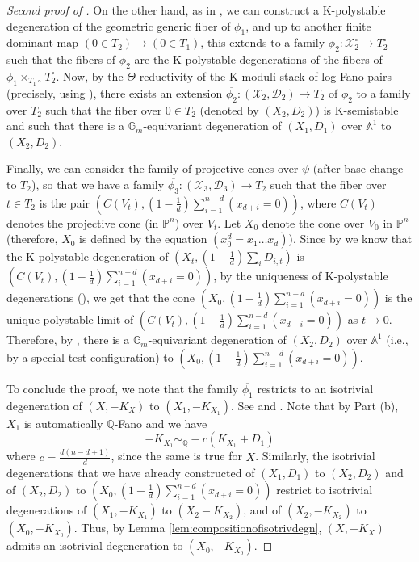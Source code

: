 \documentclass[11pt,reqno]{amsart}
\newcommand{\A}{\mathbb{A}}
\newcommand{\G}{\mathbb{G}}
\newcommand{\Q}{\mathbb{Q}}
\renewcommand{\P}{\mathbb{P}}
\newcommand{\cD}{\mathcal{D}}
\newcommand{\cX}{\mathcal{X}}
\numberwithin{equation}{section}
\theoremstyle{definition}
\begin{document}
\begin{proof}[Second proof of ]
On the other hand, as in , we can construct a K-polystable degeneration of the geometric generic fiber of $\phi_1$, and up to another finite dominant map $(0 \in T_2 ) \to (0 \in T_1)$, this extends to a family $\phi_2: \cX_2 ^{\circ} \to T_2 ^\circ $ such that the fibers of $\phi_2$ are the K-polystable degenerations of the fibers of $\phi_1 \times _{T_1 \circ} T_2 ^\circ$. Now, by the $\Theta$-reductivity of the K-moduli stack of log Fano pairs (precisely, using \cite[Theorem~5.2]{ABHLXReductivity}), there exists an extension $\overline{\phi_2} : (\cX_2, \cD_2) \to T_2$ of $\phi_2$ to a family over $T_2$ such that the fiber over $0 \in T_2$ (denoted by $(X_2 ,D_2) $) is K-semistable and such that there is a $\G_m$-equivariant degeneration of $(X_1, D_1)$ over $\A^1$ to $(X_2, D_2)$.  

Finally, we can consider the family of projective cones over $\psi$ (after base change to $T_2$), so that we have a family
$\overline{\phi_3} : (\cX_3, \cD_3) \to T_2 $ such that the fiber over $t \in T_2$ is the pair $(C(V_t), (1 -\frac{1}{d}) \sum _{i = 1} ^{n-d} (x_{d+i} = 0))$, where $C(V_t)$ denotes the projective cone (in $\P^n$) over $V_t$. Let $X_0$ denote the cone over $V_0$ in $\P^n$ (therefore, $X_0$ is defined by the equation $(x_0 ^d = x_1 \dots x_d)$). Since  by  we know that the K-polystable degeneration of $(X_t, (1-\frac{1}{d})\sum_{i} D_{i,t})$ is $(C(V_t), (1-\frac{1}{d})\sum_{i=1}^{n-d} (x_{d+i}=0))$, by the uniqueness of K-polystable degenerations (\cite[Theorem~1.1]{BlumXuUniquenessofpolystabledegenerations}), we get that the cone $(X_0,  (1 -\frac{1}{d}) \sum _{i = 1} ^{n-d} (x_{d+i} = 0))$ is the unique polystable limit of $(C(V_t), (1-\frac{1}{d})\sum_{i=1}^{n-d} (x_{d+i}=0)) $ as $t \to 0$. Therefore, by \cite[Theorem~3.2 (a)]{LiWangXuAlgebraicityofmetrictangentcones}, there is a $\G_m$-equivariant degeneration of $(X_2, D_2)$ over $\A^1$ (i.e., by a special test configuration) to $(X_0 ,   (1-\frac{1}{d})\sum_{i=1}^{n-d} (x_{d+i}=0)) $.

To conclude the proof, we note that the family $\overline{\phi_1}$ restricts to an isotrivial degeneration of $(X, -K_X)$ to $(X_1, -K_{X_1})$. See  and . Note that by  Part (b), $X_1$ is automatically $\Q$-Fano and we have
\[ -K_{X_1} \sim _\Q -c(K_{X_1} + D_1)\]
where $c = \frac{d(n-d+1)}{d}$, since the same is true for $X$. Similarly, the isotrivial degenerations that we have already constructed of $(X_1, D_1)$ to $(X_2, D_2)$ and of $(X_2, D_2)$ to $(X_0, (1-\frac{1}{d})\sum_{i=1}^{n-d} (x_{d+i}=0)) $ restrict to isotrivial degenerations of $(X_1, -K_{X_1})$ to $(X_2 -K_{X_2})$, and of $(X_2, -K_{X_2})$ to $(X_0, -K_{X_0})$. Thus, by Lemma \ref{lem:compositionofisotrivdegn}, $(X, -K_X)$ admits an isotrivial degeneration to $(X_0, -K_{X_0})$.
\end{proof}
\end{document}
